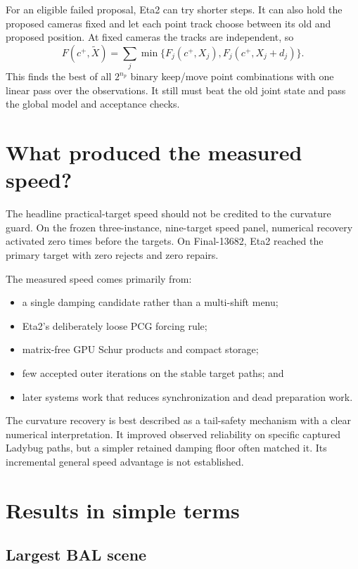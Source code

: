 \documentclass[11pt]{article}
\begin{document}
For an eligible failed proposal, Eta2 can try shorter steps.  It can also hold the proposed cameras fixed and let each point track choose between its old and proposed position.  At fixed cameras the tracks are independent, so
\[
  F(c^+,\widetilde X)=\sum_j\min\{F_j(c^+,X_j),F_j(c^+,X_j+d_j)\}.
\]
This finds the best of all $2^{n_p}$ binary keep/move point combinations with one linear pass over the observations.  It still must beat the old joint state and pass the global model and acceptance checks.

\section{What produced the measured speed?}

The headline practical-target speed should not be credited to the curvature guard.  On the frozen three-instance, nine-target speed panel, numerical recovery activated zero times before the targets.  On Final-13682, Eta2 reached the primary target with zero rejects and zero repairs.

The measured speed comes primarily from:
\begin{itemize}
  \item a single damping candidate rather than a multi-shift menu;
  \item Eta2's deliberately loose PCG forcing rule;
  \item matrix-free GPU Schur products and compact storage;
  \item few accepted outer iterations on the stable target paths; and
  \item later systems work that reduces synchronization and dead preparation work.
\end{itemize}

The curvature recovery is best described as a tail-safety mechanism with a clear numerical interpretation.  It improved observed reliability on specific captured Ladybug paths, but a simpler retained damping floor often matched it.  Its incremental general speed advantage is not established.

\section{Results in simple terms}

\subsection{Largest BAL scene}
\end{document}

